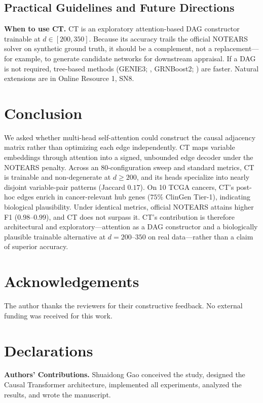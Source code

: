 \documentclass[12pt,a4paper]{article}
\begin{document}
\subsection{Practical Guidelines and Future Directions}

\textbf{When to use CT.} CT is an exploratory attention-based DAG constructor trainable at $d\in[200,350]$. Because its accuracy trails the official NOTEARS solver on synthetic ground truth, it should be a complement, not a replacement---for example, to generate candidate networks for downstream appraisal. If a DAG is not required, tree-based methods (GENIE3; \cite{huynh2010inferring}, GRNBoost2; \cite{moerman2019grnboost2}) are faster. Natural extensions are in Online Resource 1, SN8.

\section{Conclusion}

We asked whether multi-head self-attention could construct the causal adjacency matrix rather than optimizing each edge independently. CT maps variable embeddings through attention into a signed, unbounded edge decoder under the NOTEARS penalty. Across an 80-configuration sweep and standard metrics, CT is trainable and non-degenerate at $d\ge200$, and its heads specialize into nearly disjoint variable-pair patterns (Jaccard $0.17$). On 10 TCGA cancers, CT's post-hoc edges enrich in cancer-relevant hub genes ($75\%$ ClinGen Tier-1), indicating biological plausibility. Under identical metrics, official NOTEARS attains higher F1 ($0.98$--$0.99$), and CT does not surpass it. CT's contribution is therefore architectural and exploratory---attention as a DAG constructor and a biologically plausible trainable alternative at $d=200$--$350$ on real data---rather than a claim of superior accuracy.

\section*{Acknowledgements}

The author thanks the reviewers for their constructive feedback. No external funding was received for this work.

\section*{Declarations}

\noindent\textbf{Authors' Contributions.} Shuaidong Gao conceived the study, designed the Causal Transformer architecture, implemented all experiments, analyzed the results, and wrote the manuscript.
\end{document}

